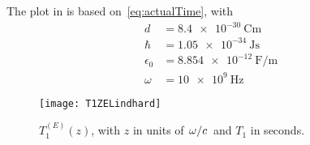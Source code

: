 \documentclass[../main.tex]{subfiles}
\begin{document}
	The plot in  is based on~\eqref{eq:actualTime}, with
	\begin{align}
		d &= \SI{8.4e-30}{\coulomb \meter} \\
		\hbar &= \SI{1.05e-34}{\J \s} \\
		\epsilon_0 &= \SI{8.854e-12}{\farad\per\meter} \\
		\omega &= \SI{10e9}{\Hz}
	\end{align}
	\begin{figure}[htp]
		\centering
		\texttt{[image: T1ZELindhard]}
		\caption{$T_{1}^{(E)}(z)$, with $z$ in units of $\flatfrac{\omega}{c}$ and $T_1$ in seconds.}\label{fig:lindhardcalc:t1ez}
	\end{figure}
\end{document}
